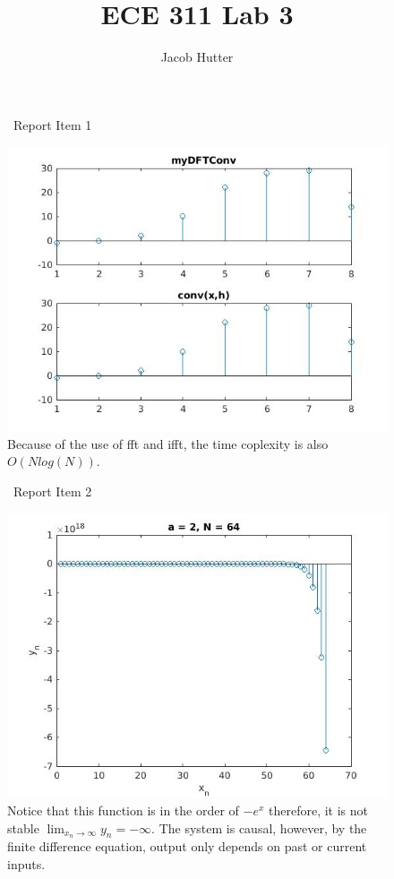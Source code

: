 \documentclass{article}
\author{Jacob Hutter}
\title{ECE 311 Lab 3}
\begin{document}
\maketitle

\begin{figure}[H]
\ Report Item 1

\includegraphics[scale = .5]{report1}
\\ Because of the use of fft and ifft, the time coplexity is also $O(Nlog(N))$.
\end{figure}



\begin{figure}[H]
\ Report Item 2

\includegraphics[scale = .5]{report2}
\\ Notice that this function is in the order of $-e^x$ 
therefore, it is not stable $\lim_{x_n\to\infty} y_n = -\infty$.
The system is causal, however, by the finite difference equation, output only 
depends on past or current inputs.
\end{figure}
\end{document}
